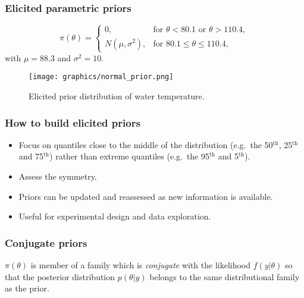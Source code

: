 \documentclass{beamer}
\newcommand{\1}{\ensuremath{\mathbf{1}}}
\begin{document}
\begin{frame}\frametitle{Elicited \textbf{parametric} priors}
	\begin{equation}
		\pi(\theta) = \begin{cases}
							0,					& \text{for $\theta < 80.1$ or $\theta > 110.4$},\\
							N(\mu,\sigma^2),	& \text{for $80.1 \leq \theta \leq 110.4$},
						\end{cases}
	\end{equation}
	with $\mu=88.3$ and $\sigma^2 = 10$.
	\begin{figure}
	\begin{center}
		\texttt{[image: graphics/normal\_prior.png]}
	\end{center}
	\caption{Elicited prior distribution of water temperature.}
	\end{figure}
\end{frame}
%
%
%
\begin{frame}\frametitle{How to build elicited priors}
	\begin{itemize}
		\item Focus on quantiles close to the middle of the distribution (e.g.\ the 50$^\text{th}$, 25$^\text{th}$ and 75$^\text{th}$) rather than extreme quantiles (e.g.\ the 95$^\text{th}$ and 5$^\text{th}$).
		\item Assess the symmetry.
		\item Priors can be updated and reassessed as new information is available.
		\item Useful for experimental design and data exploration.
	\end{itemize}
\end{frame}
%
%
%
\begin{frame}\frametitle{Conjugate priors}
	\begin{block}{}
		$\pi(\theta)$ is member of a family which is \emph{conjugate} with the likelihood $f(y|\theta)$ so that the posterior distribution $p(\theta|y)$ belongs to the same distributional family as the prior.
	\end{block}
\end{frame}
\end{document}
